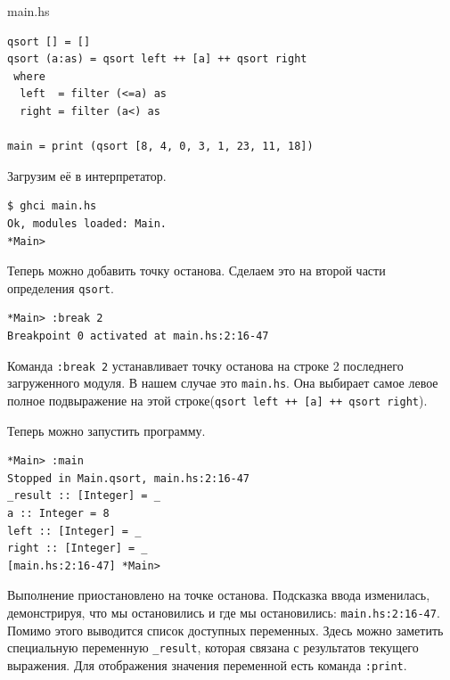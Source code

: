 \documentclass[fontsize=14pt, paper=a4, pagesize, DIV=calc]{scrartcl}
\def\code#1{\texttt{#1}}
\begin{document}
\begin{ListingEnv}
\caption{main.hs}
\begin{lstlisting}
qsort [] = []
qsort (a:as) = qsort left ++ [a] ++ qsort right
 where 
  left  = filter (<=a) as
  right = filter (a<) as

main = print (qsort [8, 4, 0, 3, 1, 23, 11, 18])
\end{lstlisting}
\end{ListingEnv}

Загрузим её в интерпретатор.

\begin{ListingEnv}
\caption{}
\begin{lstlisting}[numbers=none]
$ ghci main.hs
Ok, modules loaded: Main.
*Main>
\end{lstlisting}
\end{ListingEnv}

Теперь можно добавить точку останова. Сделаем это на второй части определения
\code{qsort}.

\begin{ListingEnv}
\caption{}
\begin{lstlisting}[numbers=none]
*Main> :break 2
Breakpoint 0 activated at main.hs:2:16-47
\end{lstlisting}
\end{ListingEnv}

Команда \code{:break 2} устанавливает точку останова на строке 2 последнего
загруженного модуля. В нашем случае это \code{main.hs}. Она выбирает самое
левое полное подвыражение на этой строке(\code{qsort left ++ [a] ++ qsort
right}).

Теперь можно запустить программу.

\begin{ListingEnv}
\caption{}
\begin{lstlisting}[numbers=none]
*Main> :main
Stopped in Main.qsort, main.hs:2:16-47
_result :: [Integer] = _
a :: Integer = 8
left :: [Integer] = _
right :: [Integer] = _
[main.hs:2:16-47] *Main> 
\end{lstlisting}
\end{ListingEnv}

Выполнение приостановлено на точке останова. Подсказка ввода изменилась,
демонстрируя, что мы остановились и где мы остановились:
\code{main.hs:2:16-47}. Помимо этого выводится список доступных переменных.
Здесь можно заметить специальную переменную \code{\_result}, которая связана с
результатов текущего выражения. Для отображения значения переменной есть
команда \code{:print}.
\end{document}
